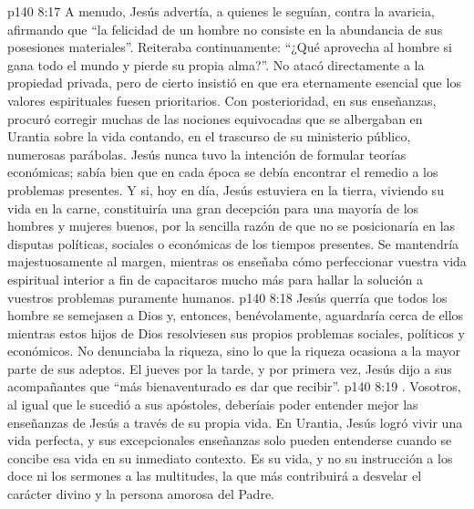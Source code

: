\vs p140 8:17 A menudo, Jesús advertía, a quienes le seguían, contra la avaricia, afirmando que “la felicidad de un hombre no consiste en la abundancia de sus posesiones materiales”. Reiteraba continuamente: “¿Qué aprovecha al hombre si gana todo el mundo y pierde su propia alma?”. No atacó directamente a la propiedad privada, pero de cierto insistió en que era eternamente esencial que los valores espirituales fuesen prioritarios. Con posterioridad, en sus enseñanzas, procuró corregir muchas de las nociones equivocadas que se albergaban en Urantia sobre la vida contando, en el trascurso de su ministerio público, numerosas parábolas. Jesús nunca tuvo la intención de formular teorías económicas; sabía bien que en cada época se debía encontrar el remedio a los problemas presentes. Y si, hoy en día, Jesús estuviera en la tierra, viviendo su vida en la carne, constituiría una gran decepción para una mayoría de los hombres y mujeres buenos, por la sencilla razón de que no se posicionaría en las disputas políticas, sociales o económicas de los tiempos presentes. Se mantendría majestuosamente al margen, mientras os enseñaba cómo perfeccionar vuestra vida espiritual interior a fin de capacitaros mucho más para hallar la solución a vuestros problemas puramente humanos.
\vs p140 8:18 \pc Jesús querría que todos los hombre se semejasen a Dios y, entonces, benévolamente, aguardaría cerca de ellos mientras estos hijos de Dios resolviesen sus propios problemas sociales, políticos y económicos. No denunciaba la riqueza, sino lo que la riqueza ocasiona a la mayor parte de sus adeptos. El jueves por la tarde, y por primera vez, Jesús dijo a sus acompañantes que “más bienaventurado es dar que recibir”.
\vs p140 8:19 . Vosotros, al igual que le sucedió a sus apóstoles, deberíais poder entender mejor las enseñanzas de Jesús a través de su propia vida. En Urantia, Jesús logró vivir una vida perfecta, y sus excepcionales enseñanzas solo pueden entenderse cuando se concibe esa vida en su inmediato contexto. Es su vida, y no su instrucción a los doce ni los sermones a las multitudes, la que más contribuirá a desvelar el carácter divino y la persona amorosa del Padre.
